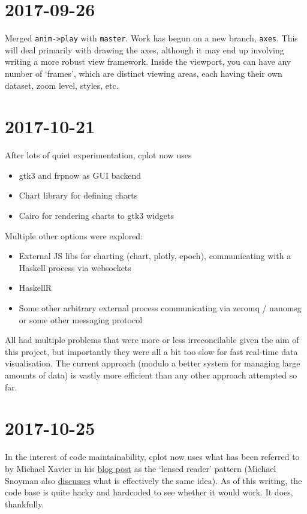 \documentclass[a5paper,10pt]{article}
\begin{document}
    \section*{2017-09-26}

    Merged \verb|anim->play| with \verb|master|. Work has begun on a new branch, \verb|axes|. This will deal primarily with drawing the axes, although it may end up involving writing a more robust view framework. Inside the viewport, you can have any number of `frames', which are distinct viewing areas, each having their own dataset, zoom level, styles, etc.

    \section*{2017-10-21}

    After lots of quiet experimentation, cplot now uses
    \begin{itemize}
        \item gtk3 and frpnow as GUI backend
        \item Chart library for defining charts
        \item Cairo for rendering charts to gtk3 widgets
    \end{itemize}
    Multiple other options were explored:
    \begin{itemize}
        \item External JS libs for charting (chart, plotly, epoch), communicating with a Haskell process via websockets
        \item HaskellR
        \item Some other arbitrary external process communicating via zeromq / nanomsg or some other messaging protocol
    \end{itemize}
    All had multiple problems that were more or less irreconcilable given the aim of this project, but importantly they were all a bit too slow for fast real-time data visualisation. The current approach (modulo a better system for managing large amounts of data) is vastly more efficient than any other approach attempted so far.
    
    \section*{2017-10-25}
    
    In the interest of code maintainability, cplot now uses what has been referred to by Michael Xavier in his \href{https://michaelxavier.net/posts/2016-04-03-Enterprise-Haskell-Pattern-Lensed-Reader.html}{blog post} as the `lensed reader' pattern (Michael Snoyman also \href{https://www.fpcomplete.com/blog/2017/06/readert-design-pattern}{discusses} what is effectively the same idea). As of this writing, the code base is quite hacky and hardcoded to see whether it would work. It does, thankfully.
\end{document}
